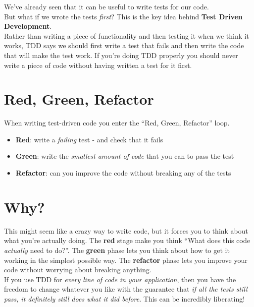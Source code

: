 We've already seen that it can be useful to write tests for our code.
\\

But what if we wrote the tests \textit{first}? This is the key idea behind \textbf{Test Driven Development}.
\\

Rather than writing a piece of functionality and then testing it when we think it works, TDD says we should first write a test that fails and then write the code that will make the test work. If you're doing TDD properly you should never write a piece of code without having written a test for it first.

\section{Red, Green, Refactor}

When writing test-driven code you enter the ``Red, Green, Refactor'' loop.

\begin{itemize}
    \item \textbf{Red}: write a \textit{failing} test - and check that it fails
    \item \textbf{Green}: write the \textit{smallest amount of code} that you can to pass the test
    \item \textbf{Refactor}: can you improve the code without breaking any of the tests
\end{itemize}


\section{Why?}

This might seem like a crazy way to write code, but it forces you to think about what you're actually doing. The \textbf{red} stage make you think ``What does this code \textit{actually} need to do?''. The \textbf{green} phase lets you think about how to get it working in the simplest possible way. The \textbf{refactor} phase lets you improve your code without worrying about breaking anything.
\\

If you use TDD for \textit{every line of code in your application}, then you have the freedom to change whatever you like with the guarantee that \textit{if all the tests still pass, it definitely still does what it did before}. This can be incredibly liberating!
\\

